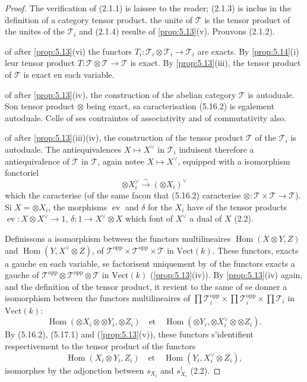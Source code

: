 \documentclass[12pt,a4paper]{article}
\theoremstyle{plain}
\theoremstyle{definition}
\theoremstyle{remark}
\DeclareMathOperator{\Hom}{Hom}
\DeclareMathOperator{\ev}{ev}
\begin{document}
\begin{proof}
The verification of (2.1.1) is laissee to the reader; (2.1.3) is inclus in the definition of a category tensor product. the unite of $\mathcal{T}$ is the tensor product of the unites of the $\mathcal{T}_i$ and (2.1.4) resulte of \ref{prop:5.13}(v). Prouvons (2.1.2).

of after \ref{prop:5.13}(vi) the functors $T_i : \mathcal{T}_i \otimes \mathcal{T}_i \to \mathcal{T}_i$ are exacts. By \ref{prop:5.14}(i) leur tensor product $T : \mathcal{T} \otimes \mathcal{T} \to \mathcal{T}$ is exact. By \ref{prop:5.13}(iii), the tensor product of $\mathcal{T}$ is exact en each variable.

of after \ref{prop:5.13}(iv), the construction of the abelian category $\mathcal{T}$ is autoduale. Son tensor product $\otimes$ being exact, sa caracterisation (5.16.2) is egalement autoduale. Celle of ses contraintes of associativity and of commutativity also.

of after \ref{prop:5.13}(iii)(iv), the construction of the tensor product $\mathcal{T}$ of the $\mathcal{T}_i$ is autoduale. The antiequivalences $X \mapsto X^\vee$ in $\mathcal{T}_i$ induisent therefore a antiequivalence of $\mathcal{T}$ in $\mathcal{T}$, again notee $X \mapsto X^\vee$, equipped with a isomorphism fonctoriel
\begin{equation}\label{eq:5.17.1}
\otimes X_i^\vee \xrightarrow{\sim} (\otimes X_i)^\vee
\end{equation}
which the caracterise (of the same facon that (5.16.2) caracterise $\otimes : \mathcal{T} \times \mathcal{T} \to \mathcal{T}$). Si $X = \otimes X_i$, the morphisms $\ev$ and $\delta$ for the $X_i$ have of the tensor products $\ev : X \otimes X^\vee \to 1$, $\delta : 1 \to X^\vee \otimes X$ which font of $X^\vee$ a dual of $X$ (2.2).

Definissons a isomorphism between the functors multilineaires $\Hom(X \otimes Y, Z)$ and $\Hom(Y, X^\vee \otimes Z)$, of $\mathcal{T}^\mathrm{opp} \times \mathcal{T}^\mathrm{opp} \times \mathcal{T}$ in $\mathrm{Vect}(k)$. These functors, exacts a gauche en each variable, se factorisent uniquement by of the functors exacts a gauche of $\mathcal{T}^\mathrm{opp} \otimes \mathcal{T}^\mathrm{opp} \otimes \mathcal{T}$ in $\mathrm{Vect}(k)$ (\ref{prop:5.13}(iv)). By \ref{prop:5.13}(iv) again, and the definition of the tensor product, it revient to the same of se donner a isomorphism between the functors multilineaires of $\prod \mathcal{T}_i^\mathrm{opp} \times \prod \mathcal{T}_i^\mathrm{opp} \times \prod \mathcal{T}_i$ in $\mathrm{Vect}(k)$:
\[
\Hom(\otimes X_i \otimes \otimes Y_i, \otimes Z_i) \quad \text{et} \quad \Hom(\otimes Y_i, \otimes X_i^\vee \otimes \otimes Z_i).
\]
By (5.16.2), (5.17.1) and (\ref{prop:5.13}(v)), these functors s'identifient respectivement to the tensor product of the functors
\[
\Hom(X_i \otimes Y_i, Z_i) \quad \text{et} \quad \Hom(Y_i, X_i^\vee \otimes Z_i),
\]
isomorphes by the adjonction between $s_{X_i}$ and $s_{X_i}^!$ (2.2).


\end{proof}
\end{document}

